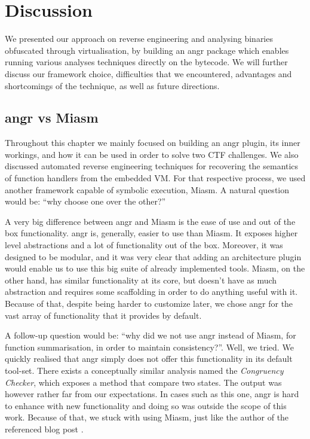 \section{Discussion}

We presented our approach on reverse engineering and analysing binaries obfuscated through virtualisation, by building an angr package which enables running various analyses techniques directly on the bytecode. We will further discuss our framework choice, difficulties that we encountered, advantages and shortcomings of the technique, as well as future directions.

\subsection{angr vs Miasm}

Throughout this chapter we mainly focused on building an angr plugin, its inner workings, and how it can be used in order to solve two \gls{CTF} challenges. We also discussed automated reverse engineering techniques for recovering the semantics of function handlers from the embedded \gls{VM}. For that respective process, we used another framework capable of symbolic execution, Miasm. A natural question would be: ``why choose one over the other?'' 

A very big difference between angr and Miasm is the ease of use and out of the box functionality. angr is, generally, easier to use than Miasm. It exposes higher level abstractions and a lot of functionality out of the box. Moreover, it was designed to be modular, and it was very clear that adding an architecture plugin would enable us to use this big suite of already implemented tools. Miasm, on the other hand, has similar functionality at its core, but doesn't have as much abstraction and requires some scaffolding in order to do anything useful with it. Because of that, despite being harder to customize later, we chose angr for the vast array of functionality that it provides by default.

A follow-up question would be: ``why did we not use angr instead of Miasm, for function summarisation, in order to maintain consistency?''. Well, we tried. We quickly realised that angr simply does not offer this functionality in its default tool-set. There exists a conceptually similar analysis named the \emph{Congruency Checker}, which exposes a method that compare two states. The output was however rather far from our expectations. In cases such as this one, angr is hard to enhance with new functionality and doing so was outside the scope of this work. Because of that, we stuck with using Miasm, just like the author of the referenced blog post \cite{zeusvm_miasm}.

